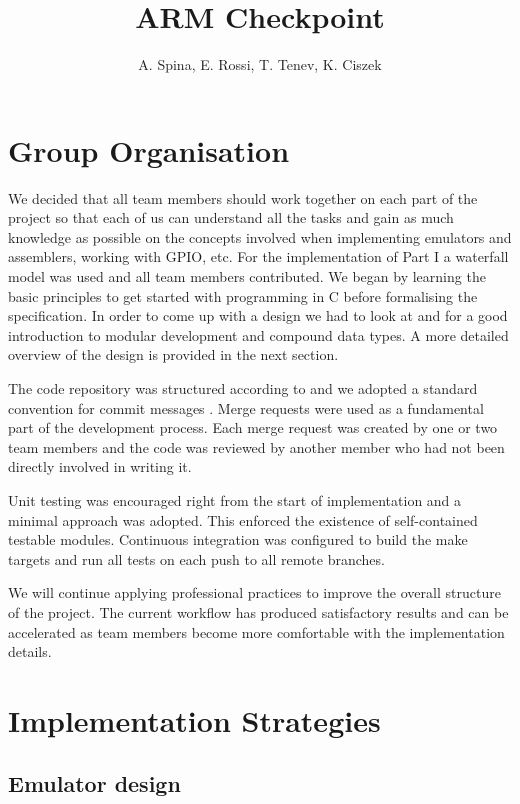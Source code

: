\documentclass[11pt]{article}
\begin{document}
\title{ARM Checkpoint}
\author{A. Spina, E. Rossi, T. Tenev, K. Ciszek}

\maketitle

\section{Group Organisation}

We decided that all team members should work together on each part of the project so that each of us can understand all the tasks and gain as much knowledge as possible on the concepts involved when implementing emulators and assemblers, working with GPIO, etc. For the implementation of Part I a waterfall model was used and all team members contributed. We began by learning the basic principles to get started with programming in C\cite{cbible} before formalising the specification. In order to come up with a design we had to look at \cite{ctopics} and \cite{artandscience} for a good introduction to modular development and compound data types. A more detailed overview of the design is provided in the next section.

The code repository was structured according to \cite{gitmodel} and we adopted a standard convention for commit messages \cite{gitcommit}. Merge requests were used as a fundamental part of the development process. Each merge request was created by one or two team members and the code was reviewed by another member who had not been directly involved in writing it.

Unit testing was encouraged right from the start of implementation and a minimal approach \cite{minunit} was adopted. This enforced the existence of self-contained testable modules. Continuous integration was configured to build the make targets and run all tests on each push to all remote branches.

We will continue applying professional practices to improve the overall structure of the project. The current workflow has produced satisfactory results and can be accelerated as team members become more comfortable with the implementation details.

\section{Implementation Strategies}

\subsection{Emulator design}
\end{document}
